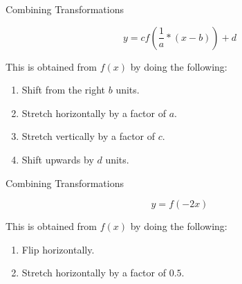 \begin{example}{}{Combining Transformations}
	
	\[
		y = cf(\frac{1}{a} * (x-b)) + d
	\]
	
	This is obtained from \(f(x)\) by doing the following:
	\begin{enumerate}
		\item Shift from the right \(b\) units.
		\item Stretch horizontally by a factor of \(a\).
		\item Stretch vertically by a factor of \(c\).
		\item Shift upwards by \(d\) units.
	\end{enumerate}
	
\end{example}
\addtocounter{TransformationsCounter}{1}
\begin{example}{}{Combining Transformations}
	
	\[
	y = f(-2x)
	\]
	
	This is obtained from \(f(x)\) by doing the following:
	\begin{enumerate}
		\item Flip horizontally.
		\item Stretch horizontally by a factor of \(0.5\).
	\end{enumerate}
	
\end{example}
\addtocounter{TransformationsCounter}{1}

\newpage
{}



